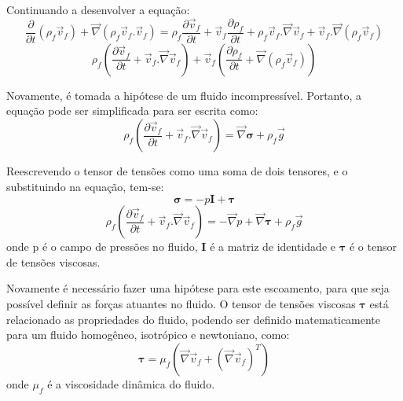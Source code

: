 Continuando a desenvolver a equação:
\begin{equation}
    \dfrac{\partial}{\partial t} (\rho_f \vec{v}_f) + 
    \vec{\nabla}(\rho_f \vec{v}_f.\vec{v}_f) =
    \rho_f \dfrac{\partial \vec{v}_f}{\partial t} + 
    \vec{v}_f \dfrac{\partial \rho_f}{\partial t} + 
    \rho_f \vec{v}_f.\vec{\nabla}\vec{v}_f +
    \vec{v}_f.\vec{\nabla}(\rho_f \vec{v}_f)
    \label{cons_qmov_ini}
\end{equation}
\begin{equation}
    \rho_f \left(
    	\dfrac{\partial \vec{v}_f}{\partial t} +
    	\vec{v}_f.\vec{\nabla}\vec{v}_f 
	\right) +
	\vec{v}_f \left(
    	\dfrac{\partial \rho_f}{\partial t} +
    	\vec{\nabla}(\rho_f \vec{v}_f)
	\right)
    \label{cons_qmov_mid}
\end{equation}

Novamente, é tomada a hipótese de um fluido incompressível.
Portanto, a equação pode ser simplificada para ser escrita como:
\begin{equation}
    \rho_f \left(
    	\dfrac{\partial \vec{v}_f}{\partial t} + 
    	\vec{v}_f.\vec{\nabla}\vec{v}_f
	\right) =
    \vec{\nabla}\boldsymbol{\sigma} +
    \rho_f \vec{g}
    \label{cons_qmov_fin}
\end{equation}

Reescrevendo o tensor de tensões como uma soma de dois tensores, e o substituindo na equação, tem-se:
\begin{equation}
    \boldsymbol{\sigma} = -p\mathbf{I} + \boldsymbol{\tau}
    \label{sigma}
\end{equation}
\begin{equation}
    \rho_f \left(
    	\dfrac{\partial \vec{v}_f}{\partial t} + 
    	\vec{v}_f.\vec{\nabla}\vec{v}_f
	\right) =
    -\vec{\nabla}p +
    \vec{\nabla}\boldsymbol{\tau} +
    \rho_f \vec{g}
    \label{cons_qmov_tensor}
\end{equation}
onde p é o campo de pressões no fluido, $\mathbf{I}$ é a matriz de identidade e $\boldsymbol{\tau}$ é o tensor de tensões viscosas.

Novamente é necessário fazer uma hipótese para este escoamento, para que seja possível definir as forças atuantes no fluido. 
O tensor de tensões viscosas $\boldsymbol{\tau}$ está relacionado as propriedades do fluido, podendo ser definido matematicamente para um fluido homogêneo, isotrópico e newtoniano, como:
\begin{equation}
    \boldsymbol{\tau} = \mu_f\left(\vec{\nabla}\vec{v}_f + \left(\vec{\nabla}\vec{v}_f \right)^T \right)
    \label{tau}
\end{equation}
onde $\mu_f$ é a viscosidade dinâmica do fluido.

